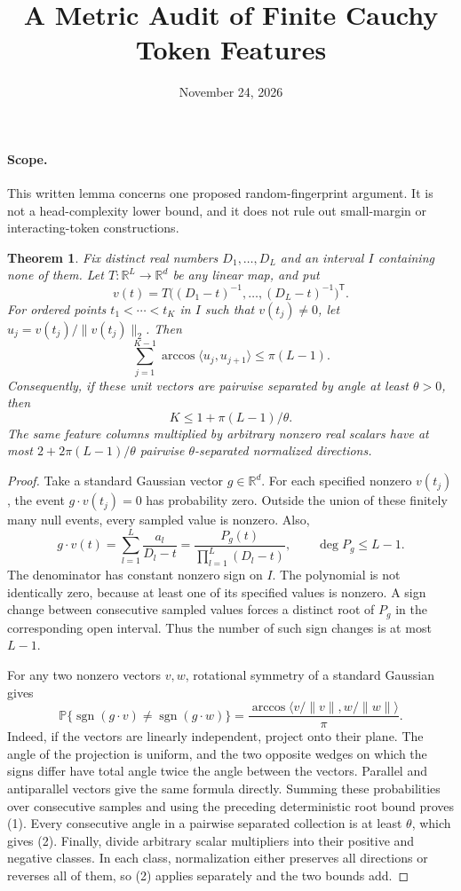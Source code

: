 \documentclass[11pt]{article}
\title{A Metric Audit of Finite Cauchy Token Features}
\author{}
\date{November 24, 2026}
\newtheorem{theorem}{Theorem}
\begin{document}
\maketitle
\paragraph{Scope.}
This written lemma concerns one proposed random-fingerprint argument.
It is not a head-complexity lower bound, and it does not rule out
small-margin or interacting-token constructions.

\begin{theorem}
Fix distinct real numbers $D_1,\ldots,D_L$ and an interval $I$
containing none of them. Let $T:\mathbb R^L\to\mathbb R^d$ be any
linear map, and put
\[
 v(t)=T\big((D_1-t)^{-1},\ldots,(D_L-t)^{-1}\big)^{\mathsf T}.
\]
For ordered points $t_1<\cdots<t_K$ in $I$ such that $v(t_j)\ne0$,
let $u_j=v(t_j)/\|v(t_j)\|_2$. Then
\[
 \sum_{j=1}^{K-1}\arccos\langle u_j,u_{j+1}\rangle
                  \le \pi(L-1). \tag{1}
\]
Consequently, if these unit vectors are pairwise separated by angle
at least $\theta>0$, then
\[
                    K\le 1+\pi(L-1)/\theta. \tag{2}
\]
The same feature columns multiplied by arbitrary nonzero real scalars
have at most $2+2\pi(L-1)/\theta$ pairwise $\theta$-separated normalized
directions.
\end{theorem}
\begin{proof}
Take a standard Gaussian vector $g\in\mathbb R^d$. For each specified
nonzero $v(t_j)$, the event $g\cdot v(t_j)=0$ has probability zero.
Outside the union of these finitely many null events, every sampled
value is nonzero. Also,
\[
 g\cdot v(t)=\sum_{l=1}^L\frac{a_l}{D_l-t}
   =\frac{P_g(t)}{\prod_{l=1}^L(D_l-t)},\qquad \deg P_g\le L-1.
\]
The denominator has constant nonzero sign on $I$. The polynomial is
not identically zero, because at least one of its specified values is
nonzero. A sign change between consecutive sampled values forces a
distinct root of $P_g$ in the corresponding open interval. Thus the
number of such sign changes is at most $L-1$.

For any two nonzero vectors $v,w$, rotational symmetry of a standard
Gaussian gives
\[
 \mathbb P\{\operatorname{sgn}(g\cdot v)\ne
                  \operatorname{sgn}(g\cdot w)\}
       =\frac{\arccos\langle v/\|v\|,w/\|w\|\rangle}{\pi}.
\]
Indeed, if the vectors are linearly independent, project onto their
plane. The angle of the projection is uniform, and the two opposite
wedges on which the signs differ have total angle twice the angle
between the vectors. Parallel and antiparallel vectors give the same
formula directly. Summing these probabilities over consecutive
samples and using the preceding deterministic root bound proves (1).
Every consecutive angle in a pairwise separated collection is at
least $\theta$, which gives (2). Finally, divide arbitrary scalar
multipliers into their positive and negative classes. In each class,
normalization either preserves all directions or reverses all of
them, so (2) applies separately and the two bounds add.
\end{proof}
\end{document}
